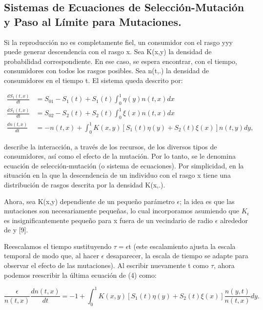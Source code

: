 \subsection{Sistemas de Ecuaciones de Selección-Mutación y Paso al Límite para Mutaciones.}

Si la reproducción no es completamente fiel, un consumidor con el rasgo yyy puede generar descendencia con el rasgo x. Sea K(x,y) la densidad de probabilidad correspondiente. En ese caso, se espera encontrar, con el tiempo, consumidores con todos los rasgos posibles. Sea n(t,.) la densidad de consumidores en el tiempo t. El sistema queda descrito por:

\begin{equation}
	\begin{split}
		\frac{d S_1(t,x)}{dt} & =S_{01}-S_1(t)+S_1(t)\int_{0}^{1}\eta(y)n(t,x)dx                 \\
		\frac{d S_1(t,x)}{dt} & =S_{02}-S_2(t)+S_2(t)\int_{0}^{1}\xi(x)n(t,x)dx                  \\
		\frac{d n(t,x)}{dt}   & =-n(t,x)+\int_{0}^{1}K(x,y)[S_1(t)\eta(y)+S_2(t)\xi(x)]n(t,y)dy,
	\end{split}
\end{equation}

describe la interacción, a través de los recursos, de los diversos tipos de consumidores, así como el efecto de la mutación. Por lo tanto, se le denomina ecuación de selección-mutación (o sistema de ecuaciones). Por simplicidad, en la situación en la que la descendencia de un individuo con el rasgo x tiene una distribución de rasgos descrita por la densidad K(x,.).

Ahora, sea K(x,y) dependiente de un pequeño parámetro $\epsilon$; la idea es que las mutaciones son necesariamente pequeñas, lo cual incorporamos asumiendo que $K_\epsilon$ es insignificantemente pequeño para x fuera de un vecindario de radio $\epsilon$ alrededor de y [9].

Reescalamos el tiempo sustituyendo $\tau=\epsilon$t (este escalamiento ajusta la escala temporal de modo que, al hacer $\epsilon$ desaparecer, la escala de tiempo se adapte para observar el efecto de las mutaciones). Al escribir nuevamente t como $\tau$, ahora podemos reescribir la última ecuación de (4) como:

\begin{equation}
	\frac{\epsilon}{n(t,x)}\frac{d n(t,x)}{dt}=-1+\int_{0}^{1}K(x,y)[S_1(t)\eta(y)+S_2(t)\xi(x)]\frac{n(y,t)}{n(t,x)}dy.
\end{equation}

